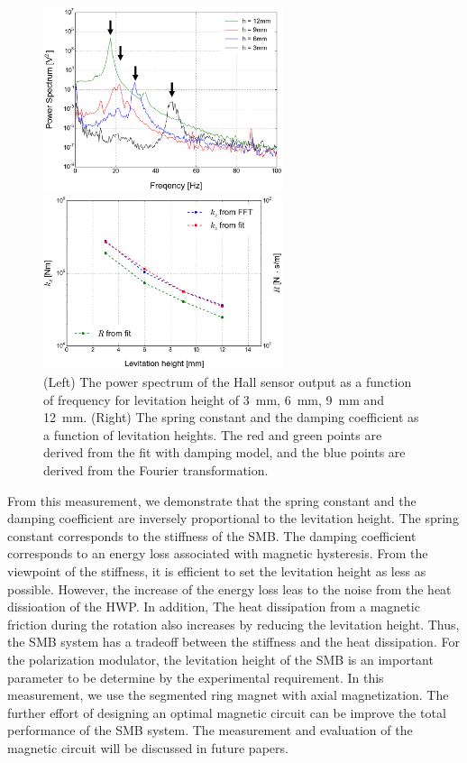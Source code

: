 \documentclass[a4paper]{jpconf}
\begin{document}
\begin{figure}[htbp]
  \centering
  \begin{minipage}{0.45\hsize}
    \includegraphics[width=70mm]{vibration_fft_B.eps}
  \end{minipage}
  \begin{minipage}{0.45\hsize}
    \centering
    \includegraphics[width=70mm]{SpringConstant.eps}
  \end{minipage}
  \caption{(Left) The power spectrum of the Hall sensor output as a function of frequency for levitation height of 3~mm, 6~mm, 9~mm and 12~mm.
    (Right) The spring constant and the damping coefficient as a function of levitation heights.
    The red and green points are derived from the fit with damping model, and the blue points are derived from the Fourier transformation.}
  \label{fig:fft}
\end{figure}

From this measurement, we demonstrate that the spring constant and the damping coefficient are inversely proportional to the levitation height.
The spring constant corresponds to the stiffness of the SMB.
The damping coefficient corresponds to an energy loss associated with magnetic hysteresis.
From the viewpoint of the stiffness, it is efficient to set the levitation height as less as possible.
However, the increase of the energy loss leas to the noise from the heat dissioation of the HWP.
In addition, The heat dissipation from a magnetic friction during the rotation also increases by reducing the levitation height.
Thus, the SMB system has a tradeoff between the stiffness and the heat dissipation.
For the polarization modulator, the levitation height of the SMB is an important parameter to be determine by the experimental requirement.
In this measurement, we use the segmented ring magnet with axial magnetization.
The further effort of designing an optimal magnetic circuit can be improve the total performance of the SMB system.
The measurement and evaluation of the magnetic circuit will be discussed in future papers.
\end{document}
